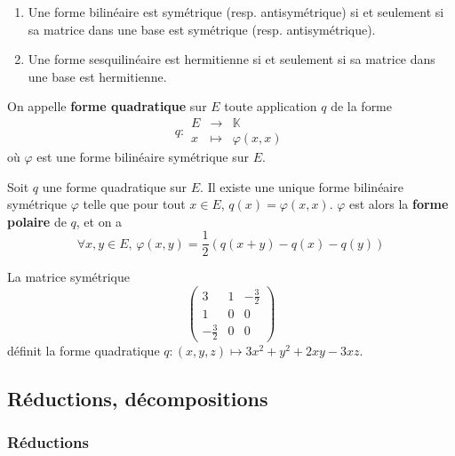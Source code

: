   \begin{proposition}
    \begin{enumerate}[label=(\roman*)]
      \item Une forme bilinéaire est symétrique (resp. antisymétrique) si et seulement si sa matrice dans une base est symétrique (resp. antisymétrique).
      \item Une forme sesquilinéaire est hermitienne si et seulement si sa matrice dans une base est hermitienne.
    \end{enumerate}
  \end{proposition}

  \begin{definition}
    On appelle \textbf{forme quadratique} sur $E$ toute application $q$ de la forme
    \[
    q :
    \begin{array}{ccc}
      E &\rightarrow& \mathbb{K} \\
      x &\mapsto& \varphi(x, x)
    \end{array}
    \]
    où $\varphi$ est une forme bilinéaire symétrique sur $E$.
  \end{definition}

  \begin{proposition}
    Soit $q$ une forme quadratique sur $E$. Il existe une unique forme bilinéaire symétrique $\varphi$ telle que pour tout $x \in E$, $q(x)=\varphi(x,x)$.
    \newpar
    $\varphi$ est alors la \textbf{forme polaire} de $q$, et on a
    \[ \forall x, y \in E, \, \varphi(x,y) = \frac{1}{2} (q(x+y) - q(x) - q(y)) \]
  \end{proposition}

  \begin{example}
    La matrice symétrique
    \[
      \begin{pmatrix}
        3 & 1 & -\frac{3}{2} \\
        1 & 0 & 0 \\
        -\frac{3}{2} & 0 & 0
      \end{pmatrix}
    \]
    définit la forme quadratique $q : (x, y, z) \mapsto 3x^2 + y^2 + 2xy - 3xz$.
  \end{example}

  \subsection{Réductions, décompositions}

  \subsubsection{Réductions}

